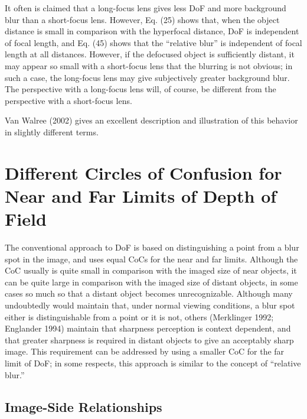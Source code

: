 \documentclass[11pt, oneside]{scrartcl}   	%
\begin{document}
It often is claimed that a long-focus lens gives less DoF and more background blur than a short-focus lens. However, Eq. (25) shows that, when the object distance is small in comparison with the hyperfocal distance, DoF is independent of focal length, and Eq. (45) shows that the “relative blur” is independent of focal length at all distances. However, if the defocused object is sufficiently distant, it may appear so small with a short-focus lens that the blurring is not obvious; in such a case, the long-focus lens may give subjectively greater background blur. The perspective with a long-focus lens will, of course, be different from the perspective with a short-focus lens.

Van Walree (2002) gives an excellent description and illustration of this behavior in slightly different terms.

\section{Different Circles of Confusion for Near and Far Limits of Depth of Field}

The conventional approach to DoF is based on distinguishing a point from a blur spot in the image, and uses equal CoCs for the near and far limits. Although the CoC usually is quite small in comparison with the imaged size of near objects, it can be quite large in comparison with the imaged size of distant objects, in some cases so much so that a distant object becomes unrecognizable. Although many undoubtedly would maintain that, under normal viewing conditions, a blur spot either is distinguishable from a point or it is not, others (Merklinger 1992; Englander 1994) maintain that sharpness perception is context dependent, and that greater sharpness is required in distant objects to give an acceptably sharp image. This requirement can be addressed by using a smaller CoC for the far limit of DoF; in some respects, this approach is similar to the concept of “relative blur.”

\subsection{Image-Side Relationships}
\end{document}
